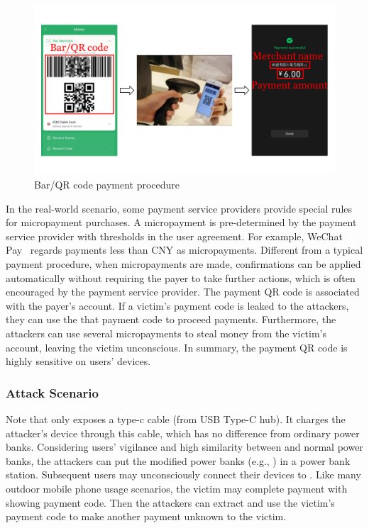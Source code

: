 \begin{figure}[t]
	\centering
	\includegraphics[width=\linewidth]{./Figs/qr_code_payment.png}
	\caption{Bar/QR code payment procedure}
	\label{fig:qr_payment_procedure}
\end{figure}


In the real-world scenario, some payment service providers provide special rules for micropayment purchases. 
A micropayment is pre-determined by the payment service provider with thresholds in the user agreement. 
For example, WeChat Pay~\cite{Wechat-pay} regards payments less than CNY  as micropayments. 
Different from a typical payment procedure, when micropayments are made, confirmations can be applied automatically without requiring the payer to take further actions, which is often encouraged by the payment service provider.
The payment QR code is associated with the payer's account. 
If a victim's payment code is leaked to the attackers, they can use the that payment code to proceed payments. 
Furthermore, the attackers can use several micropayments to steal money from the victim's account, leaving the victim unconscious. 
In summary, the payment QR code is highly sensitive on users' devices.

\subsubsection{Attack Scenario}

Note that \tool only exposes a type-c cable (from USB Type-C hub).
It charges the attacker's device through this cable, which has no difference from ordinary power banks. 
Considering users' vigilance and high similarity between \tool and normal power banks, the attackers can put the modified power banks (e.g., \tool) in a power bank station.
Subsequent users may unconsciously connect their devices to \tool.
Like many outdoor mobile phone usage scenarios, the victim may complete payment with showing payment code. 
Then the attackers can extract and use the victim's payment code to make another payment unknown to the victim.

